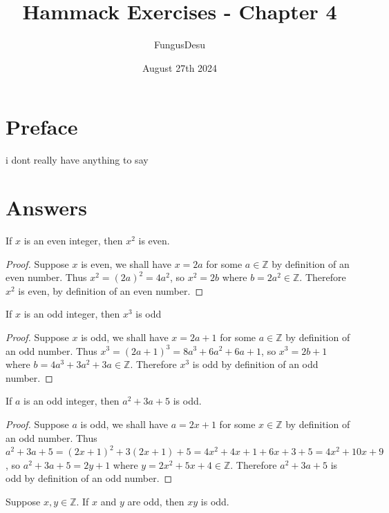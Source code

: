 \documentclass{exam}
\title{Hammack Exercises - Chapter 4}
\author{FungusDesu}
\date{August 27th 2024}
\begin{document}
\maketitle

\section{Preface}
i dont really have anything to say

\section{Answers}
\begin{proposition}{4.1}
    If $x$ is an even integer, then $x^2$ is even.
\end{proposition}

\begin{proof}
    Suppose $x$ is even, we shall have $x=2a$ for some $a\in\mathbb{Z}$ by definition of an even number. Thus $x^2 = (2a)^2 = 4a^2$, so $x^2=2b$ where $b = 2a^2 \in \mathbb{Z}$. Therefore $x^2$ is even, by definition of an even number.
\end{proof}

\begin{proposition}{4.2}
    If $x$ is an odd integer, then $x^3$ is odd
\end{proposition}

\begin{proof}
    Suppose $x$ is odd, we shall have $x=2a+1$ for some $a \in \mathbb{Z}$ by definition of an odd number. Thus $x^3 = (2a+1)^3 = 8a^3+6a^2+6a+1$, so $x^3 = 2b + 1$ where $b = 4a^3+3a^2+3a \in \mathbb{Z}$. Therefore $x^3$ is odd by definition of an odd number.
\end{proof}

\begin{proposition}{4.3}
    If $a$ is an odd integer, then $a^2 +3a+5$ is odd.
\end{proposition}

\begin{proof}
    Suppose $a$ is odd, we shall have $a=2x+1$ for some $x\in\mathbb{Z}$ by definition of an odd number. Thus $a^2 + 3a + 5 = (2x+1)^2+3(2x+1)+5 =4x^2+4x+1+6x+3+5=4x^2+10x+9$, so $a^2+3a+5 = 2y + 1$ where $y = 2x^2+5x+4 \in \mathbb{Z}$. Therefore $a^2+3a+5$ is odd by definition of an odd number.
\end{proof}

\begin{proposition}{4.4}
    Suppose $x, y \in \mathbb{Z}$. If $x$ and $y$ are odd, then $xy$ is odd.
\end{proposition}
\end{document}
